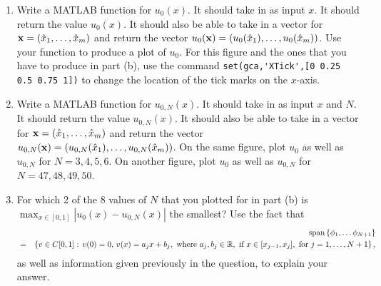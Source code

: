 \begin{enumerate}
\item Write a MATLAB function for $u_0(x)$.  It should take in as input $x$.  It should return the value $u_0(x)$.  It should also be able to take in a vector for ${\bf x}=(\hat{x}_1,\ldots,\hat{x}_m)$ and return the vector $u_0({\bf x})=(u_0(\hat{x}_1),\ldots,u_0(\hat{x}_m))$. Use your function to produce a plot of $u_0$. For this figure and the ones that you have to produce in part (b), use the command \verb|set(gca,'XTick',[0 0.25 0.5 0.75 1])| to change the location of the tick marks on the $x$-axis.
\\
\item Write a MATLAB function for $u_{0,N}(x)$.  It should take in as input $x$ and $N$.  It should return the value $u_{0,N}(x)$.  It should also be able to take in a vector for ${\bf x}=(\hat{x}_1,\ldots,\hat{x}_m)$ and return the vector $u_{0,N}({\bf x})=(u_{0,N}(\hat{x}_1),\ldots,u_{0,N}(\hat{x}_m))$. On the same figure, plot $u_0$ as well as $u_{0,N}$ for $N=3,4,5,6$. On another figure, plot $u_0$ as well as $u_{0,N}$ for $N=47,48,49,50$.
\\
\item For which 2 of the 8 values of $N$ that you plotted for in part (b) is $\displaystyle{\max_{x\in[0,1]}|u_0(x)-u_{0,N}(x)|}$ the smallest? Use the fact that
\begin{eqnarray*}
&&{\rm span}\left\{\phi_1,\ldots\phi_{N+1}\right\}
\\
&=&\left\{v\in C[0,1]:\,v(0)=0,\,v(x)=a_jx+b_j,\mbox{ where }a_j,b_j\in\mathbb{R},\mbox{ if }x\in[x_{j-1},x_j],\mbox{ for }j=1,\ldots,N+1\right\},
\end{eqnarray*}
as well as information given previously in the question, to explain your answer.
\end{enumerate}





